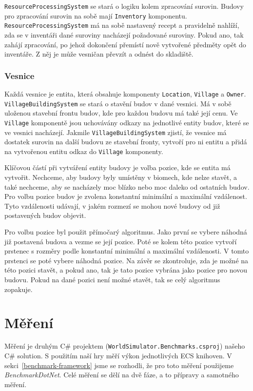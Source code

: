 \texttt{ResourceProcessingSystem} se stará o logiku kolem zpracování surovin. Budovy pro zpracování surovin na sobě mají \texttt{Inventory} komponentu. \texttt{ResourceProcessingSystem} má na sobě nastavený recept a pravidelně nahlíží, zda se v inventáři dané suroviny nacházejí požadované suroviny. Pokud ano, tak zahájí zpracování, po jehož dokončení přemístí nově vytvořené předměty opět do inventáře. Z něj je může vesničan převzít a odnést do skladiště.

\subsubsection{Vesnice}
Každá vesnice je entita, která obsahuje komponenty \texttt{Location}, \texttt{Village} a \texttt{Owner}. \texttt{VillageBuildingSystem} se stará o stavění budov v dané vesnici. Má v sobě uloženou stavební frontu budov, kde pro každou budovu má také její cenu. Ve \texttt{Village} komponentě jsou uchovávány odkazy na jednotlivé entity budov, které se ve vesnici nacházejí. Jakmile \texttt{VillageBuildingSystem} zjistí, že vesnice má dostatek surovin na další budovu ze stavební fronty, vytvoří pro ni entitu a přidá na vytvořenou entitu odkaz do \texttt{Village} komponenty.

Klíčovou částí při vytváření entity budovy je volba pozice, kde se entita má vytvořit. Nechceme, aby budovy byly umístěny v biomech, kde nelze stavět, a také nechceme, aby se nacházely moc blízko nebo moc daleko od ostatních budov. Pro volbu pozice budov je zvolena konstantní minimální a maximální vzdálenost. Tyto vzdálenosti udávají, v jakém rozmezí se mohou nové budovy od již postavených budov objevit.

Pro volbu pozice byl použit přímočarý algoritmus. Jako první se vybere náhodná již postavená budova a vezme se její pozice. Poté se kolem této pozice vytvoří prstenec s rozměry podle konstantní minimální a maximální vzdálenosti. V tomto prstenci se poté vybere náhodná pozice. Na závěr se zkontroluje, zda je možné na této pozici stavět, a pokud ano, tak je tato pozice vybrána jako pozice pro novou budovu. Pokud na dané pozici není možné stavět, tak se celý algoritmus zopakuje.

\section{Měření}
\label{benchmark-implementation}
Měření je druhým C\# projektem (\texttt{WorldSimulator.Benchmarks.csproj}) našeho C\# solution. S použitím naší hry měří výkon jednotlivých ECS knihoven. V sekci~\ref{benchmark-framework} jsme se rozhodli, že pro toto měření použijeme \textit{BenchmarkDotNet}. Celé měření se dělí na dvě fáze, a to přípravy a samotného měření.

